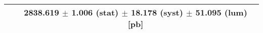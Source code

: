\begin{tabular}{lc}
\hline
                               & 2838.619 $\pm$ 1.006 (stat) $\pm$ 18.178 (syst) $\pm$ 51.095 (lum) [pb]  \\
\hline
\end{tabular}

